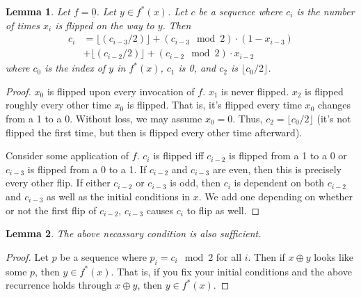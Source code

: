 \documentclass[11pt]{book}
\theoremstyle{pleasant}
\newtheorem{lemma}{Lemma}
\newcommand{\0}{\underline{0}}
\newcommand{\1}{\underline{1}}
\newcommand{\2}{\underline{2}}
\begin{document}
\begin{lemma}
Let $f = \0$. Let $y \in f^*(x)$. Let $c$ be a sequence where $c_i$ is the number of times $x_i$ is flipped on the way to $y$. Then
\begin{align*}
c_i &= \lfloor (c_{i-3} / 2) \rfloor + (c_{i-3} \mod{2}) \cdot (1 - x_{i-3})\\
    &+\lfloor (c_{i-2} / 2) \rfloor + (c_{i-2} \mod{2}) \cdot x_{i-2}
\end{align*}
where $c_0$ is the index of $y$ in $f^*(x)$, $c_1$ is 0, and $c_2$ is $\lfloor c_0 / 2 \rfloor$.
\end{lemma}
\begin{proof}

$x_0$ is flipped upon every invocation of $f$. $x_1$ is never flipped. $x_2$ is flipped roughly every other time $x_0$ is flipped. That is, it's flipped every time $x_0$ changes from a 1 to a 0. Without loss, we may assume $x_0 = 0$. Thus, $c_2 = \lfloor c_0 / 2 \rfloor$ (it's not flipped the first time, but then is flipped every other time afterward).

Consider some application of $f$. $c_i$ is flipped iff $c_{i-2}$ is flipped from a 1 to a 0 or $c_{i-3}$ is flipped from a 0 to a 1. If $c_{i-2}$ and $c_{i-3}$ are even, then this is precisely every other flip. If either $c_{i-2}$ or $c_{i-3}$ is odd, then $c_i$ is dependent on both $c_{i-2}$ and $c_{i-3}$ as well as the initial conditions in $x$. We add one depending on whether or not the first flip of $c_{i-2}$, $c_{i-3}$ causes $c_i$ to flip as well.
\end{proof}

\begin{lemma}
The above necassary condition is also sufficient.
\end{lemma}
\begin{proof}
Let $p$ be a sequence where $p_i = c_i \mod{2}$ for all $i$. Then if $x \oplus y$ looks like some $p$, then $y \in f^*(x)$. That is, if you fix your initial conditions and the above recurrence holds through $x \oplus y$, then $y \in f^*(x)$.
\end{proof}
\end{document}
